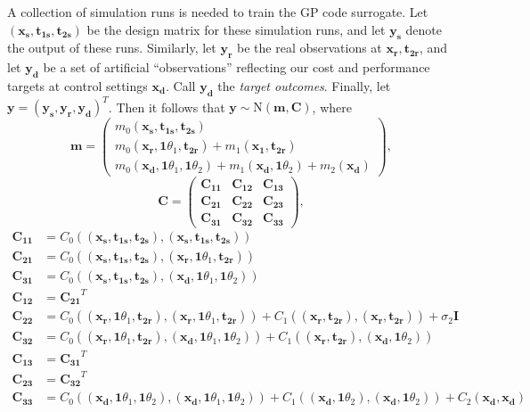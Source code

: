 \documentclass[12pt]{article}
\begin{document}
%
A collection of simulation runs is needed to train the GP code surrogate.
%
Let $(\mathbf{x_s},\mathbf{t_{1s}},\mathbf{t_{2s}})$ be the design matrix for these simulation runs, and let $\mathbf{y_s}$ denote the output of these runs.
%
Similarly, let $\mathbf{y_r}$ be the real observations at $\mathbf{x_r},\mathbf{t_{2r}}$, and let $\mathbf {y_d}$ be a set of artificial ``observations'' reflecting our cost and performance targets at control settings $\mathbf {x_d}$.
%
Call $\mathbf{y_d}$ the {\em target outcomes}.
%
Finally, let $\mathbf y = (\mathbf{y_s},\mathbf{y_r},\mathbf{y_d})^T$.
%
Then it follows that $\mathbf y\sim \mathrm{N}(\mathbf m,\mathbf C)$, where
\[
\mathbf m = \begin{pmatrix}
m_0(\mathbf{x_s},\mathbf{t_{1s}},\mathbf{t_{2s}})\\
m_0(\mathbf{x_r},\mathbf1\theta_1,\mathbf{t_{2r}}) + m_1(\mathbf{x_1},\mathbf{t_{2r}})\\
m_0(\mathbf{x_d},\mathbf1\theta_1,\mathbf1\theta_2) + m_1(\mathbf{x_d},\mathbf1\theta_2) + m_2(\mathbf{x_d})
\end{pmatrix},
\]
\[
\mathbf C = \begin{pmatrix}
\mathbf{C_{11}} & \mathbf{C_{12}} & \mathbf{C_{13}}\\
\mathbf{C_{21}} & \mathbf{C_{22}} & \mathbf{C_{23}}\\
\mathbf{C_{31}} & \mathbf{C_{32}} & \mathbf{C_{33}}
\end{pmatrix},
\]
\begin{align*}
\mathbf{C_{11}}&=C_0\left((\mathbf{x_s},\mathbf{t_{1s}},\mathbf{t_{2s}}),(\mathbf{x_s},\mathbf{t_{1s}},\mathbf{t_{2s}})\right)\\
\mathbf{C_{21}}&=C_0\left((\mathbf{x_s},\mathbf{t_{1s}},\mathbf{t_{2s}}),(\mathbf{x_r},\mathbf1\theta_1,\mathbf{t_{2r}})\right)\\
\mathbf{C_{31}}&=C_0\left((\mathbf{x_s},\mathbf{t_{1s}},\mathbf{t_{2s}}),(\mathbf{x_d},\mathbf1\theta_1,\mathbf1\theta_2)\right)\\
\mathbf{C_{12}}&=\mathbf{C_{21}}^T\\
\mathbf{C_{22}}&=C_0\left((\mathbf{x_r},\mathbf1\theta_1,\mathbf{t_{2r}}),(\mathbf{x_r},\mathbf1\theta_1,\mathbf{t_{2r}})\right) + C_1\left( (\mathbf{x_r},\mathbf{t_{2r}}),(\mathbf{x_r},\mathbf{t_{2r}}) \right) + \sigma_2 \mathbf I\\
\mathbf{C_{32}}&=C_0\left((\mathbf{x_r},\mathbf1\theta_1,\mathbf{t_{2r}}),(\mathbf{x_d},\mathbf1\theta_1,\mathbf1\theta_2)\right) + C_1\left( (\mathbf{x_r},\mathbf{t_{2r}}),(\mathbf{x_d},\mathbf1\theta_2) \right)\\
\mathbf{C_{13}}&=\mathbf{C_{31}}^T\\
\mathbf{C_{23}}&=\mathbf{C_{32}}^T\\
\mathbf{C_{33}}&=C_0\left((\mathbf{x_d},\mathbf1\theta_1,\mathbf1\theta_2),(\mathbf{x_d},\mathbf1\theta_1,\mathbf1\theta_2)\right) + C_1\left( (\mathbf{x_d},\mathbf1\theta_2),(\mathbf{x_d},\mathbf1\theta_2) \right) + C_2(\mathbf{x_d},\mathbf{x_d})
\end{align*}
\end{document}

